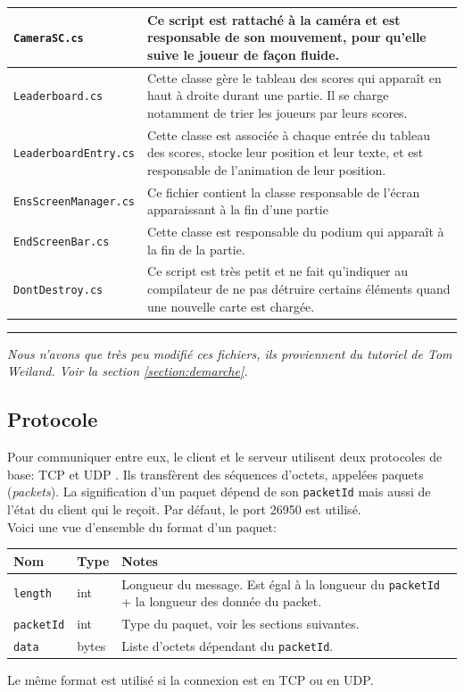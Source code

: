 \documentclass[a4paper]{article}
\begin{document}
\begin{center}
\begin{longtable}{|l|p{10cm}|}
    \hline
    \texttt{CameraSC.cs} & Ce script est rattaché à la caméra et est responsable de son mouvement, pour qu’elle suive le joueur de façon fluide.\\
    \hline
    \texttt{Leaderboard.cs} & Cette classe gère le tableau des scores qui apparaît en haut à droite durant une partie. Il se charge notamment de trier les joueurs par leurs scores.\\
    \hline
    \texttt{LeaderboardEntry.cs} & Cette classe est associée à chaque entrée du tableau des scores, stocke leur position et leur texte, et est responsable de l’animation de leur position.\\
    \hline
    \texttt{EnsScreenManager.cs} & Ce fichier contient la classe responsable de l’écran apparaissant à la fin d’une partie\\
    \hline
    \texttt{EndScreenBar.cs} & Cette classe est responsable du podium qui apparaît à la fin de la partie.\\
    \hline
    \texttt{DontDestroy.cs} & Ce script est très petit et ne fait qu'indiquer au compilateur de ne pas détruire certains éléments quand une nouvelle carte est chargée.\\
    \hline
\end{longtable}
\end{center}
\hrule
\textit{\footnotemark[1]Nous n’avons que très peu modifié ces fichiers, ils proviennent du tutoriel de Tom Weiland. Voir la section \ref{section:demarche}.}

\subsection{Protocole}
Pour communiquer entre eux, le client et le serveur utilisent deux protocoles de base: TCP \cite{tcp} et
UDP \cite{udp}. Ils transfèrent des séquences d’octets, appelées paquets (\textit{packets}). La signification d’un paquet dépend de son \texttt{packetId} mais aussi de l’état du client qui le reçoit. Par défaut, le port 26950 est utilisé. \\
Voici une vue d’ensemble du format d’un paquet:
\begin{center}
\begin{tabular}{|l|l|p{10cm}|}
    \hline
    Nom & Type & Notes \\
    \hline\hline
    \texttt{length} & int & Longueur du message. Est égal à la longueur du \texttt{packetId} + la longueur des donnée du packet. \\
    \hline
    \texttt{packetId} & int & Type du paquet, voir les sections suivantes. \\
    \hline
    \texttt{data} & bytes & Liste d’octets dépendant du \texttt{packetId}. \\
    \hline
\end{tabular}
\end{center}
Le même format est utilisé si la connexion est en TCP ou en UDP.
\end{document}
